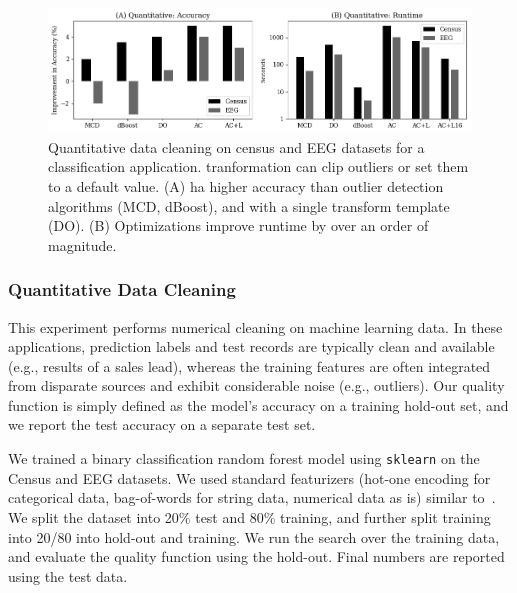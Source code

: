 
\begin{figure}
    \centering
    \includegraphics[width=\columnwidth]{exp/exp2.png}
    \caption{\small Quantitative data cleaning on census and EEG datasets for a classification application.  \sys tranformation can clip outliers or set them to a default value. (A) \sys ha higher accuracy than outlier detection algorithms (MCD, dBoost), and \sys with a single transform template (DO).  (B) Optimizations improve \sys runtime by over an order of magnitude.  \label{exp2a}}
\end{figure}

\subsubsection{Quantitative Data Cleaning}\label{s:expquant}
This experiment performs numerical cleaning on machine learning data.  In these applications, prediction labels and test records are typically clean and available (e.g., results of a sales lead), whereas the training features are often integrated from disparate sources and exhibit considerable noise (e.g., outliers).  Our quality function is simply defined as the model's accuracy on a training hold-out set, and we report the test accuracy on a separate test set.

We trained a binary classification random forest model using \texttt{sklearn} on the Census and EEG datasets.  We used standard featurizers (hot-one encoding for categorical data, bag-of-words for string data, numerical data as is) similar to~\cite{gokhale2014corleone}. 
We split the dataset into 20\% test and 80\% training, and further split training into 20/80 into hold-out and training.  We run the search over the training data, and evaluate the quality function using the hold-out.  Final numbers are reported using the test data.


